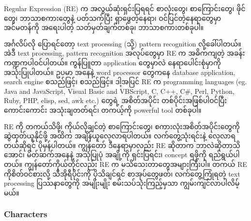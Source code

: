 \documentclass[11pt]{article}
\begin{document}
Regular Expression (RE) က အလွယ်ဆုံးရှင်းပြရရင် စာလုံးတွေ၊ စာကြောင်းတွေ၊
ဖိုင်တွေ၊ ဘာသာစကားတွေနဲ့ ပတ်သက်ပြီး ရှာဖွေတဲ့နေရာ၊ ဝင်ပြင်တဲ့နေရာတွေမှာ
အင်မတန်ကို အရေးပါတဲ့ သတ်မှတ်ချက်တစ်ခု၊ ဘာသာစကားတစ်ခုပါ။

အင်္ဂလိပ်လို ပြောရင်တော့ text processing (သို့) pattern recognition
လို့ခေါ်ပါတယ်။ အဲဒီ text processing, pattern recognition အလုပ်တွေမှာ RE
က အဓိကကျတဲ့ အခန်းကဏ္ဍကပါဝင်ပါတယ်။ ကွန်ပြူတာ application တွေမှာလဲ
နေရာပေါင်းစုံမှာကို အသုံးပြုပါတယ်။ ဥပမာ အနေနဲ့ word processor တွေကနေ
database application, search engine စသည်ဖြင့်၊ စသည်ဖြင့်။ ဒါ့အပြင် RE က
programming languages (eg. Java and JavaScript, Visual Basic and
VBScript, C, C++, C\#, Perl, Python, Ruby, PHP, elisp, sed, awk etc.)
တွေရဲ့ အစိတ်အပိုင်း တစ်ပိုင်းအဖြစ်ပါဝင်ပြီး ကောင်းကောင်း အသုံးချတတ်ရင်၊
တကယ့်ကို powerful tool တစ်ခုပါ။

RE ကို တကယ်သိဖို့၊ ကိုယ်လိုချင်တဲ့ စာကြောင်းတွေ၊
စကားလုံးအစိတ်အပိုင်းတွေကို ဆွဲထုတ်ယူနိုင်ဖို့ အထိက အချိန်ယူလေ့လာရပါတယ်။
လက်တွေ့သုံးရင်းနဲ့ လေ့လာရတယ်ဆိုရင် ပိုမှန်ပါတယ်။ ကျွန်တော် ဒီနေရာမှာလည်း
RE ဆိုတာက ဘာလဲဆိုတာသိအောင်၊ မိတ်ဆက်အနေနဲ့ အသုံပြုပုံ အချို့ကို
ရှင်းပြရင်း၊ concept ရဖို့ကို ရည်ရွယ်ပါတယ်။ ကျွန်တော်ကိုယ်တိုင်လည်း RE က
မသိသေးတာတွေအများကြီးပါ။ တကယ် RE ကိုစိတ်ဝင်စားလို့ သီအိုရီပိုင်းကို
ပိုသိချင်ရင် စာအုပ်တွေဖတ်၊ လက်တွေ့ကြုံရတဲ့ text processing ပြဿနာတွေကို
အမျိုးမျိုး စမ်းသပ်သုံးကြည့်မှသာ ကျွမ်းကျင်လာပါလိမ့်မယ်။

    \subsubsection{Characters}\label{characters}
\end{document}
